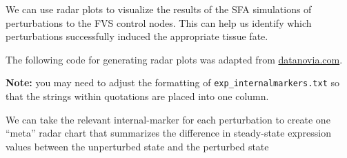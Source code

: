 \documentclass[
]{book}
\newenvironment{Shaded}{\begin{snugshade}}{\end{snugshade}}
\newcommand{\CommentTok}[1]{\textcolor[rgb]{0.56,0.35,0.01}{\textit{#1}}}
\newcommand{\ControlFlowTok}[1]{\textcolor[rgb]{0.13,0.29,0.53}{\textbf{#1}}}
\newcommand{\DataTypeTok}[1]{\textcolor[rgb]{0.13,0.29,0.53}{#1}}
\newcommand{\DecValTok}[1]{\textcolor[rgb]{0.00,0.00,0.81}{#1}}
\newcommand{\FloatTok}[1]{\textcolor[rgb]{0.00,0.00,0.81}{#1}}
\newcommand{\KeywordTok}[1]{\textcolor[rgb]{0.13,0.29,0.53}{\textbf{#1}}}
\newcommand{\NormalTok}[1]{#1}
\newcommand{\OtherTok}[1]{\textcolor[rgb]{0.56,0.35,0.01}{#1}}
\newcommand{\StringTok}[1]{\textcolor[rgb]{0.31,0.60,0.02}{#1}}
\begin{document}
We can use radar plots to visualize the results of the SFA simulations of perturbations to the FVS control nodes. This can help us identify which perturbations successfully induced the appropriate tissue fate.

The following code for generating radar plots was adapted from \href{https://www.google.com/search?q=create+_beautiful_+radar+chart\&oq=create+beautiful+rada\&aqs=chrome.1.69i57j0i10i22i30.11973j0j1\&sourceid=chrome\&ie=UTF-8}{datanovia.com}.

\textbf{Note: } you may need to adjust the formatting of \texttt{exp\_internalmarkers.txt} so that the strings within quotations are placed into one column.

\begin{Shaded}
\end{Shaded}

We can take the relevant internal-marker for each perturbation to create one ``meta'' radar chart that summarizes the difference in steady-state expression values between the unperturbed state and the perturbed state
\end{document}
